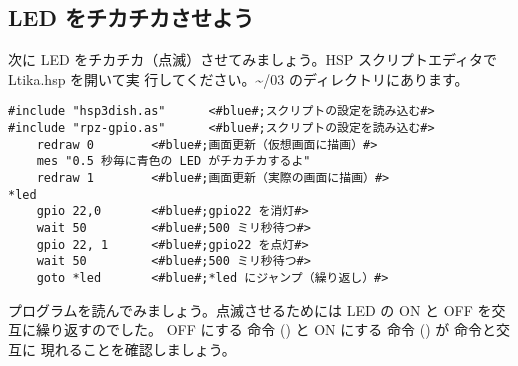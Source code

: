 \subsection{LED をチカチカさせよう}

次に LED をチカチカ（点滅）させてみましょう。HSP スクリプトエディタで Ltika.hsp を開いて実
行してください。\textasciitilde /03 のディレクトリにあります。\\

\begin{lstlisting}[caption=Ltika.hsp,label=Ltika.hsp]
#include "hsp3dish.as"		<#blue#;スクリプトの設定を読み込む#>
#include "rpz-gpio.as"		<#blue#;スクリプトの設定を読み込む#>
	redraw 0		<#blue#;画面更新（仮想画面に描画）#>
	mes "0.5 秒毎に青色の LED がチカチカするよ"
	redraw 1		<#blue#;画面更新（実際の画面に描画）#>
*led
	gpio 22,0		<#blue#;gpio22 を消灯#>
	wait 50 		<#blue#;500 ミリ秒待つ#>
	gpio 22, 1 		<#blue#;gpio22 を点灯#>
	wait 50 		<#blue#;500 ミリ秒待つ#>
	goto *led 		<#blue#;*led にジャンプ（繰り返し）#>
\end{lstlisting}

プログラムを読んでみましょう。点滅させるためには LED の ON と OFF を交互に繰り返すのでした。
OFF にする  命令 () と ON にする  命令 () が  命令と交互に
現れることを確認しましょう。\\

\begin{tcolorbox}[title=\useOmetoi]
\begin{enumerate}
\end{enumerate}
\end{tcolorbox}
